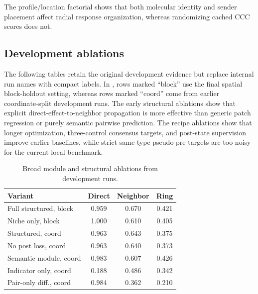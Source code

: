 \documentclass[sigconf,review,balance=false]{acmart}
\begin{document}
The profile/location factorial shows that both molecular identity and sender
placement affect radial response organization, whereas randomizing cached CCC
scores does not.

\subsection{Development ablations}
\label{app:development_ablations}

The following tables retain the original development evidence but replace internal run names with compact labels. In , rows marked ``block'' use the final spatial block-holdout setting, whereas rows marked ``coord'' come from earlier coordinate-split development runs. The early structural ablations show that explicit direct-effect-to-neighbor propagation is more effective than generic patch regression or purely semantic pairwise prediction. The recipe ablations show that longer optimization, three-control consensus targets, and post-state supervision improve earlier baselines, while strict same-type pseudo-pre targets are too noisy for the current local benchmark.

\begin{table}[t]
\centering
\caption{Broad module and structural ablations from development runs.}
\label{tab:app_ablation_modules}
\scriptsize
\setlength{\tabcolsep}{3pt}
\renewcommand{\arraystretch}{1.14}
\begin{tabular}{@{}lccc@{}}
\toprule
Variant & Direct & Neighbor & Ring \\
\midrule
Full structured, block & 0.959 & 0.670 & 0.421 \\
Niche only, block & 1.000 & 0.610 & 0.405 \\
Structured, coord & 0.963 & 0.643 & 0.375 \\
No post loss, coord & 0.963 & 0.640 & 0.373 \\
Semantic module, coord & 0.983 & 0.607 & 0.426 \\
Indicator only, coord & 0.188 & 0.486 & 0.342 \\
Pair-only diff., coord & 0.984 & 0.362 & 0.210 \\
\bottomrule
\end{tabular}
\end{table}
\end{document}

